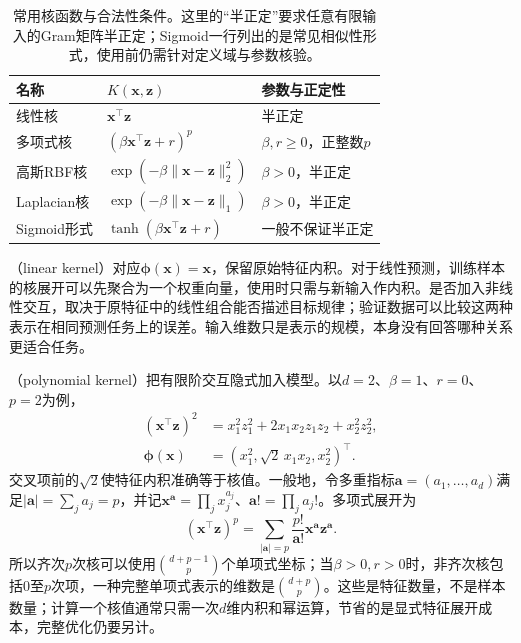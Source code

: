 \begin{table}[htbp]
  \centering
  \small
  \begin{tabularx}{\linewidth}{@{}>{\RaggedRight\arraybackslash}p{18mm}>{\RaggedRight\arraybackslash}X>{\RaggedRight\arraybackslash}p{27mm}@{}}
    \toprule
    名称 & $K(\bm{x},\bm{z})$ & 参数与正定性\\
    \midrule
    线性核 & $\bm{x}^{\top}\bm{z}$ & 半正定\\
    多项式核 & $(\beta\bm{x}^{\top}\bm{z}+r)^p$ & $\beta,r\ge0$，正整数$p$\\
    高斯RBF核 & $\exp(-\beta\lVert\bm{x}-\bm{z}\rVert_2^2)$ & $\beta>0$，半正定\\
    Laplacian核 & $\exp(-\beta\lVert\bm{x}-\bm{z}\rVert_1)$ & $\beta>0$，半正定\\
    Sigmoid形式 & $\tanh(\beta\bm{x}^{\top}\bm{z}+r)$ & 一般不保证半正定\\
    \bottomrule
  \end{tabularx}
  \caption{常用核函数与合法性条件。这里的“半正定”要求任意有限输入的Gram矩阵半正定；Sigmoid一行列出的是常见相似性形式，使用前仍需针对定义域与参数核验。}
  \label{tab:classification-svm-kernels}
\end{table}

（linear kernel）对应$\bm{\phi}(\bm{x})=\bm{x}$，保留原始特征内积。对于线性预测，训练样本的核展开可以先聚合为一个权重向量，使用时只需与新输入作内积。是否加入非线性交互，取决于原特征中的线性组合能否描述目标规律；验证数据可以比较这两种表示在相同预测任务上的误差。输入维数只是表示的规模，本身没有回答哪种关系更适合任务。

（polynomial kernel）把有限阶交互隐式加入模型。以$d=2$、$\beta=1$、$r=0$、$p=2$为例，
\[
  \begin{aligned}
    (\bm{x}^{\top}\bm{z})^2
      &=x_1^2z_1^2+2x_1x_2z_1z_2+x_2^2z_2^2,\\
    \bm{\phi}(\bm{x})
      &=(x_1^2,\sqrt2\,x_1x_2,x_2^2)^{\top}.
  \end{aligned}
\]
交叉项前的$\sqrt2$使特征内积准确等于核值。一般地，令多重指标$\bm{a}=(a_1,\ldots,a_d)$满足$|\bm{a}|=\sum_j a_j=p$，并记$\bm{x}^{\bm{a}}=\prod_j x_j^{a_j}$、$\bm{a}!=\prod_j a_j!$。多项式展开为
\[
  (\bm{x}^{\top}\bm{z})^p
  =\sum_{|\bm{a}|=p}\frac{p!}{\bm{a}!}
     \bm{x}^{\bm{a}}\bm{z}^{\bm{a}}.
\]
所以齐次$p$次核可以使用$\binom{d+p-1}{p}$个单项式坐标；当$\beta>0,r>0$时，非齐次核包括$0$至$p$次项，一种完整单项式表示的维数是$\binom{d+p}{p}$。这些是特征数量，不是样本数量；计算一个核值通常只需一次$d$维内积和幂运算，节省的是显式特征展开成本，完整优化仍要另计。

